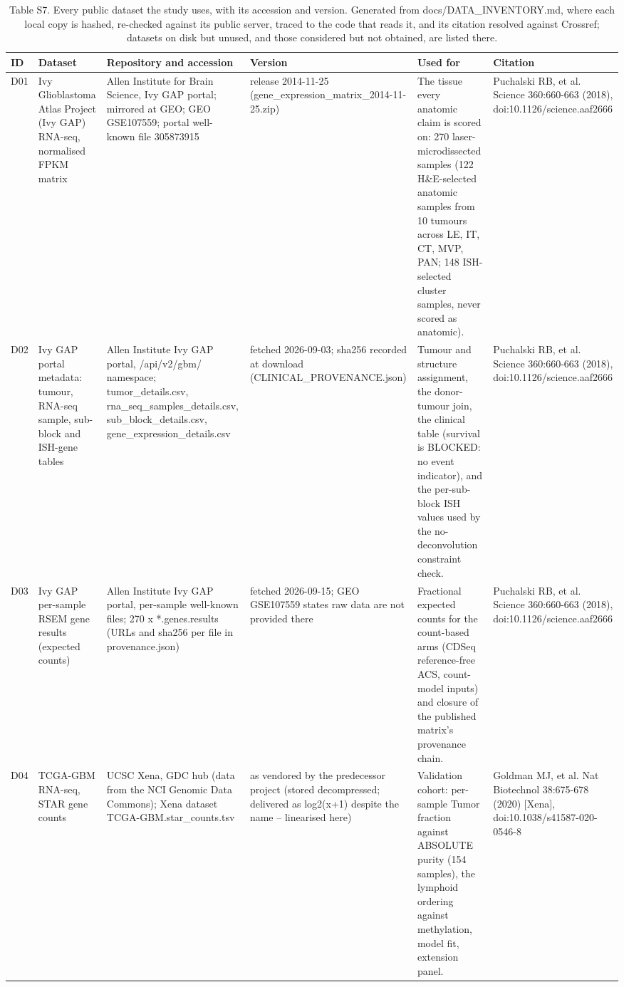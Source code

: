 \begin{table}[htbp]
\centering
\small
\caption{Table S7. Every public dataset the study uses, with its accession and version. Generated from docs/DATA\_INVENTORY.md, where each local copy is hashed, re-checked against its public server, traced to the code that reads it, and its citation resolved against Crossref; datasets on disk but unused, and those considered but not obtained, are listed there.}
\label{tab:S7_data_sources}
\begin{tabular}{llllll}
\toprule
\textbf{ID} & \textbf{Dataset} & \textbf{Repository and accession} & \textbf{Version} & \textbf{Used for} & \textbf{Citation} \\
\midrule
D01 & Ivy Glioblastoma Atlas Project (Ivy GAP) RNA-seq, normalised FPKM matrix & Allen Institute for Brain Science, Ivy GAP portal; mirrored at GEO; GEO GSE107559; portal well-known file 305873915 & release 2014-11-25 (gene\_expression\_matrix\_2014-11-25.zip) & The tissue every anatomic claim is scored on: 270 laser-microdissected samples (122 H\&E-selected anatomic samples from 10 tumours across LE, IT, CT, MVP, PAN; 148 ISH-selected cluster samples, never scored as anatomic). & Puchalski RB, et al. Science 360:660-663 (2018), doi:10.1126/science.aaf2666 \\
D02 & Ivy GAP portal metadata: tumour, RNA-seq sample, sub-block and ISH-gene tables & Allen Institute Ivy GAP portal, /api/v2/gbm/ namespace; tumor\_details.csv, rna\_seq\_samples\_details.csv, sub\_block\_details.csv, gene\_expression\_details.csv & fetched 2026-09-03; sha256 recorded at download (CLINICAL\_PROVENANCE.json) & Tumour and structure assignment, the donor-tumour join, the clinical table (survival is BLOCKED: no event indicator), and the per-sub-block ISH values used by the no-deconvolution constraint check. & Puchalski RB, et al. Science 360:660-663 (2018), doi:10.1126/science.aaf2666 \\
D03 & Ivy GAP per-sample RSEM gene results (expected counts) & Allen Institute Ivy GAP portal, per-sample well-known files; 270 x *.genes.results (URLs and sha256 per file in provenance.json) & fetched 2026-09-15; GEO GSE107559 states raw data are not provided there & Fractional expected counts for the count-based arms (CDSeq reference-free ACS, count-model inputs) and closure of the published matrix's provenance chain. & Puchalski RB, et al. Science 360:660-663 (2018), doi:10.1126/science.aaf2666 \\
D04 & TCGA-GBM RNA-seq, STAR gene counts & UCSC Xena, GDC hub (data from the NCI Genomic Data Commons); Xena dataset TCGA-GBM.star\_counts.tsv & as vendored by the predecessor project (stored decompressed; delivered as log2(x+1) despite the name -- linearised here) & Validation cohort: per-sample Tumor fraction against ABSOLUTE purity (154 samples), the lymphoid ordering against methylation, model fit, extension panel. & Goldman MJ, et al. Nat Biotechnol 38:675-678 (2020) [Xena], doi:10.1038/s41587-020-0546-8 \\

\end{tabular}
\end{table}
